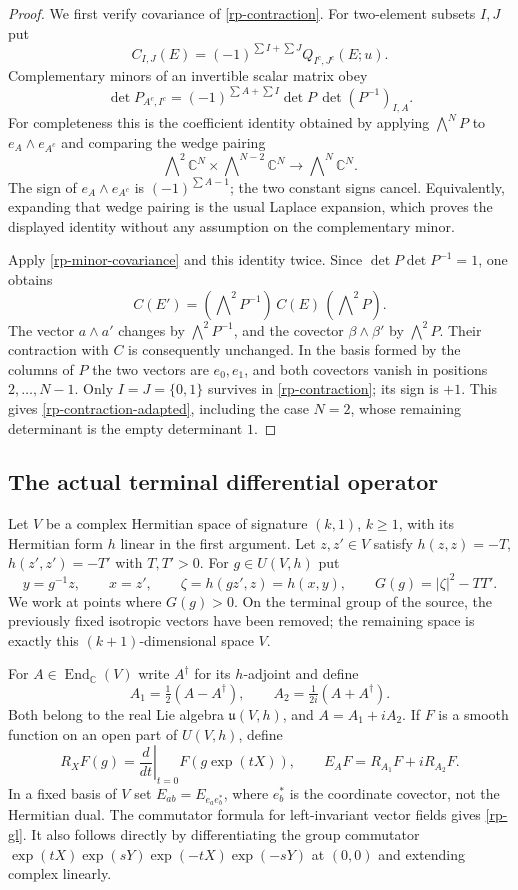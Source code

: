 \begin{proof}
We first verify covariance of \eqref{rp-contraction}.
For two-element subsets $I,J$ put
\[
       C_{I,J}(E)=(-1)^{\sum I+\sum J}Q_{I^c,J^c}(E;u).
\]
Complementary minors of an invertible scalar matrix obey
\[
 \det P_{A^c,I^c}
   =(-1)^{\sum A+\sum I}\det P\,\det(P^{-1})_{I,A}.
\]
For completeness this is the coefficient identity obtained
by applying $\bigwedge^NP$ to
$e_A\wedge e_{A^c}$ and comparing the wedge pairing
\[
 \bigwedge\nolimits^2\mathbb C^N\times
 \bigwedge\nolimits^{N-2}\mathbb C^N
                   \longrightarrow\bigwedge\nolimits^N\mathbb C^N.
\]
The sign of $e_A\wedge e_{A^c}$ is
$(-1)^{\sum A-1}$; the two constant signs cancel.
Equivalently, expanding that wedge pairing is the usual
Laplace expansion, which proves the displayed identity
without any assumption on the complementary minor.

Apply \eqref{rp-minor-covariance} and this identity twice.
Since $\det P\det P^{-1}=1$, one obtains
\[
 C(E')=(\bigwedge\nolimits^2P^{-1})\,C(E)\,
                                     (\bigwedge\nolimits^2P).
\]
The vector $a\wedge a'$ changes by $\bigwedge^2P^{-1}$,
and the covector $\beta\wedge\beta'$ by $\bigwedge^2P$.
Their contraction with $C$ is consequently unchanged.
In the basis formed by the columns of $P$ the two vectors
are $e_0,e_1$, and both covectors vanish in positions
$2,\ldots,N-1$.  Only $I=J=\{0,1\}$ survives in
\eqref{rp-contraction}; its sign is $+1$.  This gives
\eqref{rp-contraction-adapted}, including the case $N=2$,
whose remaining determinant is the empty determinant $1$.
\end{proof}

\subsection{The actual terminal differential operator}

Let $V$ be a complex Hermitian space of signature $(k,1)$,
$k\geq1$, with its Hermitian form $h$ linear in the first
argument.  Let $z,z'\in V$ satisfy
$h(z,z)=-T$, $h(z',z')=-T'$ with $T,T'>0$.
For $g\in U(V,h)$ put
\[
 y=g^{-1}z,\qquad x=z',\qquad
 \zeta=h(gz',z)=h(x,y),\qquad
 G(g)=|\zeta|^2-TT'.
\]
We work at points where $G(g)>0$.  On the terminal group
of the source, the previously fixed isotropic vectors
have been removed; the remaining space is exactly this
$(k+1)$-dimensional space $V$.

For $A\in\operatorname{End}_{\mathbb C}(V)$ write
$A^\dagger$ for its $h$-adjoint and define
\[
 A_1=\tfrac12(A-A^\dagger),\qquad
 A_2=\tfrac1{2i}(A+A^\dagger).
\]
Both belong to the real Lie algebra $\mathfrak u(V,h)$,
and $A=A_1+iA_2$.  If $F$ is a smooth function on an
open part of $U(V,h)$, define
\[
 R_XF(g)=\left.\frac{d}{dt}\right|_{t=0}F(g\exp(tX)),
 \qquad E_AF=R_{A_1}F+iR_{A_2}F .
\]
In a fixed basis of $V$ set $E_{ab}=E_{e_a e_b^*}$,
where $e_b^*$ is the coordinate covector, not the
Hermitian dual.  The commutator formula for
left-invariant vector fields gives \eqref{rp-gl}.
It also follows directly by differentiating the group
commutator
$\exp(tX)\exp(sY)\exp(-tX)\exp(-sY)$ at $(0,0)$
and extending complex linearly.

